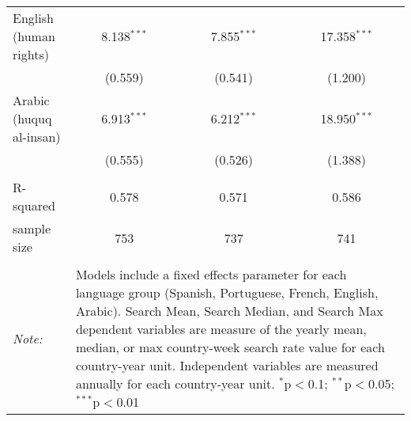 \begin{table}[!htbp]
\begin{tabular}{@{\extracolsep{5pt}}lccc}
  English (human rights) & 8.138$^{***}$ & 7.855$^{***}$ & 17.358$^{***}$ \\ 
  & (0.559) & (0.541) & (1.200) \\ 
  Arabic (huquq al-insan) & 6.913$^{***}$ & 6.212$^{***}$ & 18.950$^{***}$ \\ 
  & (0.555) & (0.526) & (1.388) \\ 
 \hline \\[-1.8ex] 
R-squared  & 0.578 & 0.571 & 0.586 \\ 
sample size  & 753 & 737 & 741 \\ 
\hline 
\hline \\[-1.8ex] 
\textit{Note:}  & \multicolumn{3}{l}{\parbox[t]{8cm}{Models include a fixed effects parameter for each language group (Spanish, Portuguese, French, English, Arabic). Search Mean, Search Median, and Search Max dependent variables are measure of the yearly mean, median, or max country-week search rate value for each country-year unit. Independent variables are measured annually for each country-year unit. $^{*}$p$<$0.1; $^{**}$p$<$0.05; $^{***}$p$<$0.01}} \\ 
\end{tabular} 
\end{table} 
